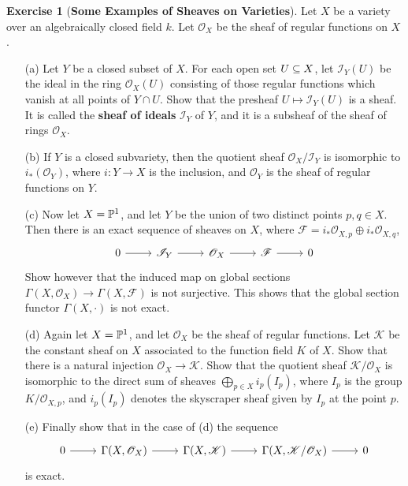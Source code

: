 \documentclass[11pt]{book}
\theoremstyle{definition}
\newtheorem{exercise}{Exercise}[section]
\begin{document}
\begin{exercise}[\textbf{Some Examples of Sheaves on Varieties}]
Let $X$ be a variety over an algebraically closed field $k$. Let $\mathscr{O}_X$ be the sheaf of regular functions on $X$.
\begin{itemize}
\item[(a)] Let $Y$ be a closed subset of $X$. For each open set $U\sub X$, let $\mathscr{I}_Y(U)$ be the ideal in the ring $\mathscr{O}_X(U)$ consisting of those regular functions which vanish at all points of $Y\cap U$. Show that the presheaf $U\mapsto\mathscr{I}_Y(U)$ is a sheaf. It is called the \textbf{sheaf of ideals} $\mathscr{I}_Y$ of $Y$, and it is a subsheaf of the sheaf of rings $\mathscr{O}_X$.
\item[(b)] If $Y$ is a closed subvariety, then the quotient sheaf $\mathscr{O}_X/\mathscr{I}_Y$ is isomorphic to $i_*(\mathscr{O}_Y)$, where $i:Y\to X$ is the inclusion, and $\mathscr{O}_Y$ is the sheaf of regular functions on $Y$.
\item[(c)] Now let $X=\P^1$, and let $Y$ be the union of two distinct points $p,q\in X$. Then there is an exact sequence of sheaves on $X$, where $\mathscr{F}=i_*\mathscr{O}_{X,p}\oplus i_*\mathscr{O}_{X,q}$,
\[\begin{tikzcd}
0\ar[r]&\mathscr{I}_Y\ar[r]&\mathscr{O}_X\ar[r]&\mathscr{F}\ar[r]&0
\end{tikzcd}\] 
Show however that the induced map on global sections $\Gamma(X,\mathscr{O}_X)\to\Gamma(X,\mathscr{F})$ is not surjective. This shows that the global section functor $\Gamma(X,\cdot)$ is not exact.
\item[(d)] Again let $X=\P^1$, and let $\mathscr{O}_X$ be the sheaf of regular functions. Let $\mathscr{K}$ be the constant sheaf on $X$ associated to the function field $K$ of $X$. Show that there is a natural injection $\mathscr{O}_X\to\mathscr{K}$. Show that the quotient sheaf $\mathscr{K}/\mathscr{O}_X$ is isomorphic to the direct sum of sheaves $\bigoplus_{p\in X}i_p(I_p)$, where $I_p$ is the group $K/\mathscr{O}_{X,p}$, and $i_p(I_p)$ denotes the skyscraper sheaf given by $I_p$ at the point $p$.
\item[(e)] Finally show that in the case of (d) the sequence
\[\begin{tikzcd}
0\ar[r]&\Gamma(X,\mathscr{O}_X)\ar[r]&\Gamma(X,\mathscr{K})\ar[r]&\Gamma(X,\mathscr{K}/\mathscr{O}_X)\ar[r]&0
\end{tikzcd}\]
is exact.
\end{itemize}
\end{exercise}
\end{document}
